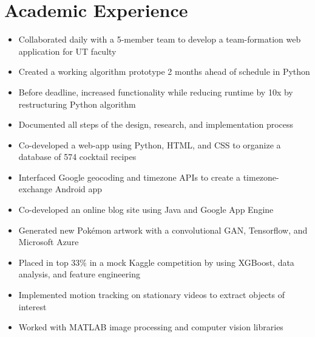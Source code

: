 \documentclass{resume}
\begin{document}
\section{Academic Experience}
\begin{itemize}
    \item Collaborated daily with a 5-member team to develop a team-formation web application for UT faculty
    \item Created a working algorithm prototype 2 months ahead of schedule in Python
    \item Before deadline, increased functionality while reducing runtime by 10x by restructuring Python algorithm
    \item Documented all steps of the design, research, and implementation process
\end{itemize}
\begin{itemize}
    \item Co-developed a web-app using Python, HTML, and CSS to organize a database of 574 cocktail recipes
    \item Interfaced Google geocoding and timezone APIs to create a timezone-exchange Android app
    \item Co-developed an online blog site using Java and Google App Engine
\end{itemize}
\begin{itemize}
    \item Generated new Pokémon artwork with a convolutional GAN, Tensorflow, and Microsoft Azure
    \item Placed in top 33\% in a mock Kaggle competition by using XGBoost, data analysis, and feature engineering
\end{itemize}
\begin{itemize}
    \item Implemented motion tracking on stationary videos to extract objects of interest
    \item Worked with MATLAB image processing and computer vision libraries
\end{itemize}
\end{document}
